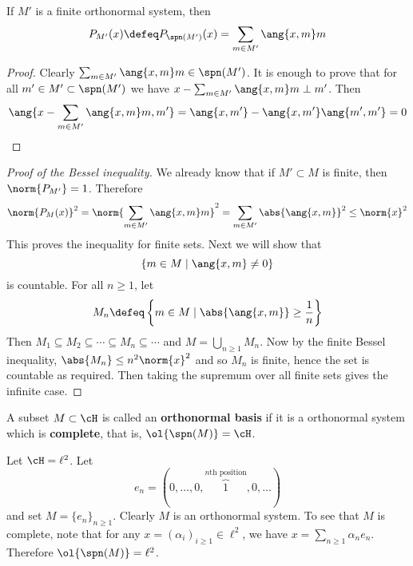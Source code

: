 \begin{lem}
	If $M'$ is a finite orthonormal system, then
	\[P_{M'}(x) \defeq P_{\spn(M')}(x) = \sum_{m \in M'} \ang{x,m}m\]
\end{lem}

\begin{proof}
	Clearly $\sum_{m \in M'} \ang{x,m}m \in \spn(M')$.
	It is enough to prove that for all $m' \in M' \subset \spn(M')$ we have $x - \sum_{m \in M'} \ang{x,m}m \perp m'$.
	Then
	\[\ang{x - \sum_{m \in M'} \ang{x,m}m, m'} = \ang{x,m'} - \ang{x,m'}\ang{m',m'} = 0 \qedhere\]
\end{proof}

\begin{proof}[Proof of the Bessel inequality]
	We already know that if $M' \subset M$ is finite, then $\norm{P_{M'}}=1$.
	Therefore
	\[\norm{P_M(x)}^2 = \norm{\sum_{m \in M'} \ang{x,m}m}^2 = \sum_{m \in M'} \abs{\ang{x,m}}^2 \leq \norm{x}^2\]
	This proves the inequality for finite sets.
	Next we will show that
	\[\{m \in M \mid \ang{x,m} \neq 0\}\]
	is countable.
	For all $n \geq 1$, let
	\[M_n \defeq \left\{m \in M \mid \abs{\ang{x,m}} \geq \frac 1n\right\}\]
	Then $M_1 \subseteq M_2 \subseteq \cdots \subseteq M_n \subseteq \cdots$ and $M = \bigcup_{n \geq 1} M_n$.
	Now by the finite Bessel inequality, $\abs{M_n} \leq n^2 \norm{x}^2$ and so $M_n$ is finite, hence the set is countable as required.
	Then taking the supremum over all finite sets gives the infinite case.
\end{proof}

\begin{defn}
	A subset $M \subset \cH$ is called an \textbf{orthonormal basis} if it is a orthonormal system which is \textbf{complete}, that is, $\ol{\spn(M)}=\cH$.
\end{defn}

\begin{exam}
	Let $\cH = \ell^2$.
	Let
	\[e_n = (0,\ldots,0,\overbrace{1}^{n\text{th position}},0,\ldots)\]
	and set $M = \{e_n\}_{n \geq 1}$.
	Clearly $M$ is an orthonormal system.
	To see that $M$ is complete, note that for any $x = (\alpha_i)_{i \geq 1} \in \ell^2$, we have $x = \sum_{n \geq 1} \alpha_n e_n$.
	Therefore $\ol{\spn(M)} = \ell^2$.
\end{exam}